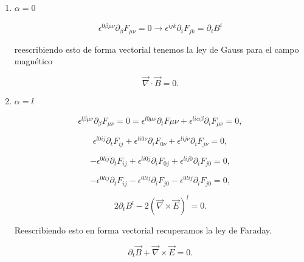         \begin{enumerate}
            \item $\alpha = 0$

            \begin{equation*}
                \epsilon^{0\beta\mu\nu}\partial_{\beta}F_{\mu\nu} = 0 \rightarrow \epsilon^{ijk}\partial_iF_{jk}=\partial_iB^i
            \end{equation*}

            reescribiendo esto de forma vectorial tenemos la ley de Gauss para el campo magnético

            \begin{equation}
                \Vec{\nabla}\cdot\Vec{B} = 0.
            \end{equation}

            \item $\alpha = l$

            \begin{equation*}
                \epsilon^{l\beta\mu\nu}\partial_{\beta}F_{\mu\nu} = 0 = \epsilon^{l0\mu\nu}\partial_tF{\mu\nu} + \epsilon^{li\alpha\beta}\partial_iF_{\mu\nu} = 0,
            \end{equation*}

            \begin{equation*}
                \epsilon^{l0ij}\partial_tF_{ij} + \epsilon^{li0\nu}\partial_iF_{0\nu} + \epsilon^{lij\nu}\partial_iF_{j\nu} = 0,
            \end{equation*}

            \begin{equation*}
                -\epsilon^{0lij}\partial_tF_{ij} + \epsilon^{li0j}\partial_iF_{0j} + \epsilon^{lij0}\partial_iF_{j0}=0,
            \end{equation*}

            \begin{equation*}
                -\epsilon^{0lij}\partial_tF_{ij} - \epsilon^{0lij}\partial_iF_{j0}-\epsilon^{0lij}\partial_iF_{j0}=0,
            \end{equation*}

            \begin{equation}
                2\partial_tB^{l}-2(\Vec{\nabla}\times\Vec{E})^{l} = 0.
            \end{equation}

            Reescribiendo esto en forma vectorial recuperamos la ley de Faraday.

            \begin{equation}
                \partial_t\Vec{B} + \Vec{\nabla}\times\Vec{E} = 0.
            \end{equation}
        \end{enumerate}

